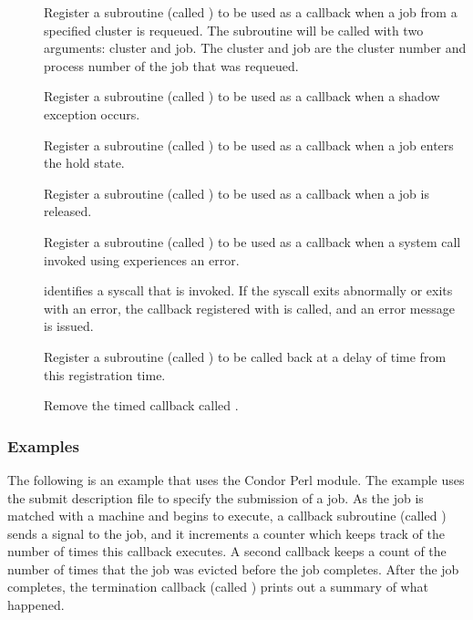 \begin{description}
  \item []
  Register a subroutine (called )
  to be used as a callback when a job from
  a specified cluster is requeued.  The subroutine will be
  called with two arguments: cluster and job. The cluster
  and job are the cluster number and process number of the job that
  was requeued.

  \item []
  Register a subroutine (called )
  to be used as a callback when a shadow exception occurs.

  \item []
  Register a subroutine (called )
  to be used as a callback when a job enters the hold state.

  \item []
  Register a subroutine (called )
  to be used as a callback when a job is released.

  \item []
  Register a subroutine (called )
  to be used as a callback when a system call invoked using 
  experiences an error.

  \item []
   identifies a syscall that is invoked.
  If the syscall exits abnormally or exits with an error, the callback
  registered with  is called, and
  an error message is issued.

  \item []
  Register a subroutine (called )
  to be called back at a delay of  time from
  this registration time.

  \item []
  Remove the timed callback called .

\end{description}


\subsubsection{Examples}

The following is an example that uses the Condor Perl module.
The example uses the submit description file 
 to specify the submission of a job.
As the job is matched with a machine and begins to execute,
a callback  subroutine (called \verb@execute@)
sends a  signal to the job,
and it increments a counter which keeps track of the
number of times this callback executes.
A second callback keeps a count of the number of times
that the job was evicted before the job completes.
After the job completes, the termination
callback (called \verb@normal@) prints out a summary of what happened.

